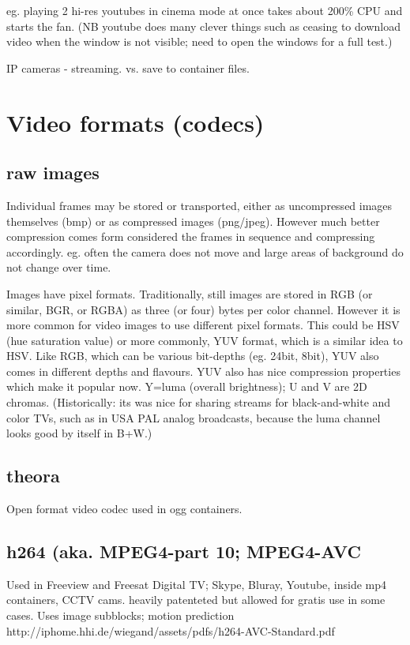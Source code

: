 \documentclass[oneside,english]{scrbook}
\begin{document}
eg. playing 2 hi-res youtubes in cinema mode at once takes about 200\% CPU and starts the fan. (NB youtube does many clever things such as ceasing to download video when the window is not visible; need to open the windows for a full test.)

IP cameras - streaming.  vs. save to container files.



\chapter{Video formats (codecs)}

\section{raw images}
Individual frames may be stored or transported, either as uncompressed images themselves (bmp) or as compressed images (png/jpeg). However much better compression comes form considered the frames in sequence and compressing accordingly. eg. often the camera does not move and large areas of background do not change over time.

Images have pixel formats. Traditionally, still images are stored in RGB (or similar, BGR, or RGBA) as three (or four) bytes per color channel.  However it is more common for video images to use different pixel formats.  This could be HSV (hue saturation value) or more commonly, YUV format, which is a similar idea to HSV.  Like RGB, which can be various bit-depths (eg. 24bit, 8bit), YUV also comes in different depths and flavours. YUV also has nice compression properties which make it popular now.  Y=luma (overall brightness); U and V are 2D chromas. (Historically: its was nice for sharing streams for black-and-white and color TVs, such as in USA PAL analog broadcasts, because the luma channel looks good by itself in B+W.)

\section{theora}
Open format video codec used in ogg containers.

\section{h264 (aka. MPEG4-part 10; MPEG4-AVC}
Used in Freeview and Freesat Digital TV; Skype, Bluray, Youtube, inside mp4 containers, CCTV cams.
heavily patenteted but allowed for gratis use in some cases.
Uses image subblocks;  motion prediction
http://iphome.hhi.de/wiegand/assets/pdfs/h264-AVC-Standard.pdf
\end{document}
